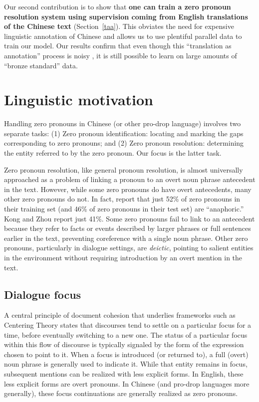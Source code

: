 \documentclass[11pt]{report}
\begin{document}
Our second contribution is to show that \textbf{one can train a zero pronoun resolution system using supervision coming from English translations of the Chinese text} (Section~\ref{taa}). This obviates the need for expensive linguistic annotation of Chinese and allows us to use plentiful parallel data to train our model. Our results confirm that even though this ``translation as annotation'' process is noisy%
, it is still possible to learn on large amounts of ``bronze standard'' data.%

\section{Linguistic motivation} \label{ling}

Handling zero pronouns in Chinese (or other pro-drop language) involves two separate tasks: (1) Zero pronoun identification: locating and marking the gaps corresponding to zero pronouns; and (2) Zero pronoun resolution: determining the entity referred to by the zero pronoun. Our focus is the latter task.

Zero pronoun resolution, like general pronoun resolution, is almost universally approached as a problem of linking a pronoun to an overt noun phrase antecedent in the text. However, while some zero pronouns do have overt antecedents, many other zero pronouns do not. In fact, \cite{zhao2007identification} report that just 52\% of zero pronouns in their training set (and 46\% of zero pronouns in their test set) are ``anaphoric.'' Kong and Zhou \cite{kong2010tree} report just 41\%. Some zero pronouns fail to link to an antecedent because they refer to facts or events described by larger phrases or full sentences earlier in the text, preventing coreference with a single noun phrase. Other zero pronouns, particularly in dialogue settings, are \emph{deictic}, pointing to salient entities in the environment without requiring introduction by an overt mention in the text.%

\subsection{Dialogue focus}

A central principle of document cohesion that underlies frameworks such as Centering Theory \cite{grosz1995centering} states that discourses tend to settle on a particular focus for a time, before eventually switching to a new one. The status of a particular focus within this flow of discourse is typically signaled by the form of the expression chosen to point to it. When a focus is introduced (or returned to), a full (overt) noun phrase is generally used to indicate it. While that entity remains in focus, subsequent mentions can be realized with less explicit forms. In English, these less explicit forms are overt pronouns. In Chinese (and pro-drop languages more generally), these focus continuations are generally realized as zero pronouns.
\end{document}
